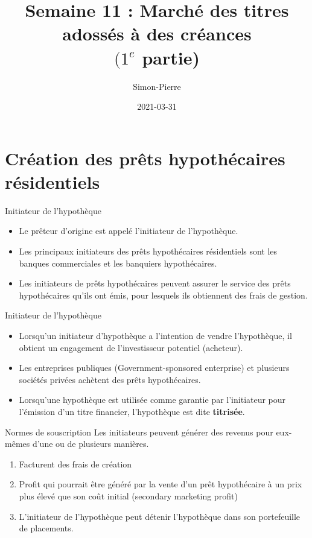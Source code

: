 \documentclass[10pt,a4paper]{beamer}
\title{Semaine 11 : Marché des titres adossés à des créances \\ $(1^{e}$ partie)}
\date{2021-03-31}
\author{Simon-Pierre}
\institute{Université Laval}
\begin{document}
\begin{frame}
\titlepage
\end{frame}

\begin{frame}
\tableofcontents
\end{frame}

\section{Création des prêts hypothécaires résidentiels}
\begin{frame}{Initiateur de l'hypothèque}
\begin{itemize}[label=\bullet]
\item Le prêteur d'origine est appelé l'initiateur de l'hypothèque.
\vspace{0.5cm}
\item Les principaux initiateurs des prêts hypothécaires résidentiels sont les banques commerciales et les banquiers hypothécaires.
\vspace{0.5cm}
\item Les initiateurs de prêts hypothécaires peuvent assurer le service des prêts hypothécaires qu'ils ont émis, pour lesquels ils obtiennent des frais de gestion.
\end{itemize}
\end{frame}


\begin{frame}{Initiateur de l'hypothèque}
\begin{itemize}[label=\bullet]
\item Lorsqu'un initiateur d'hypothèque a l'intention de vendre l'hypothèque, il obtient un engagement de l'investisseur potentiel (acheteur).
\vspace{0.5cm}
\item Les entreprises publiques (Government-sponsored enterprise) et plusieurs sociétés privées achètent des prêts hypothécaires.
\vspace{0.5cm}
\item Lorsqu'une hypothèque est utilisée comme garantie par l'initiateur pour l'émission d'un titre financier, l'hypothèque est dite \textbf{titrisée}.
\end{itemize}
\end{frame}


\begin{frame}{Normes de souscription}
Les initiateurs peuvent générer des revenus pour eux-mêmes d'une ou de plusieurs manières.
\begin{enumerate}[label=\arabic*)]
\item Facturent des frais de création
\item Profit qui pourrait être généré par la vente d'un prêt hypothécaire à un prix plus élevé que son coût initial (secondary marketing profit)
\item L'initiateur de l'hypothèque peut détenir l'hypothèque dans son portefeuille de placements.
\end{enumerate}
\end{frame}
\end{document}
